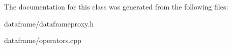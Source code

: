 The documentation for this class was generated from the following files\+:\begin{DoxyCompactItemize}
\item 
dataframe/dataframeproxy.\+h\item 
dataframe/operators.\+cpp\end{DoxyCompactItemize}
